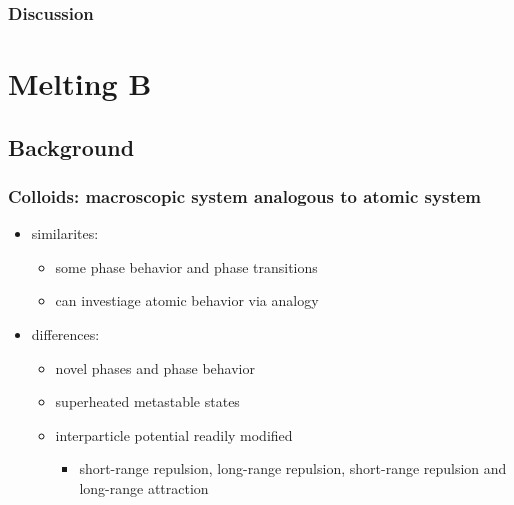 \documentclass[11pt]{article}
\begin{document}
\subsubsection{Discussion}
\label{sec-2.3.7}

\section{Melting B}
\label{sec-3}

\subsection{Background}
\label{sec-3.1}

\subsubsection{Colloids: macroscopic system analogous to atomic system}
\label{sec-3.1.1}

\begin{itemize}

\item similarites:\\
\label{sec-3.1.1.1}

\begin{itemize}

\item some phase behavior and phase transitions\\
\label{sec-3.1.1.1.1}


\item can investiage atomic behavior via analogy\\
\label{sec-3.1.1.1.2}

\end{itemize} %

\item differences:\\
\label{sec-3.1.1.2}

\begin{itemize}

\item novel phases and phase behavior\\
\label{sec-3.1.1.2.1}


\item superheated metastable states\\
\label{sec-3.1.1.2.2}


\item interparticle potential readily modified\\
\label{sec-3.1.1.2.3}

\begin{itemize}

\item short-range repulsion, long-range repulsion, short-range repulsion and long-range attraction\\
\label{sec-3.1.1.2.3.1}

\end{itemize} %
\end{itemize} %
\end{itemize} %
\end{document}
